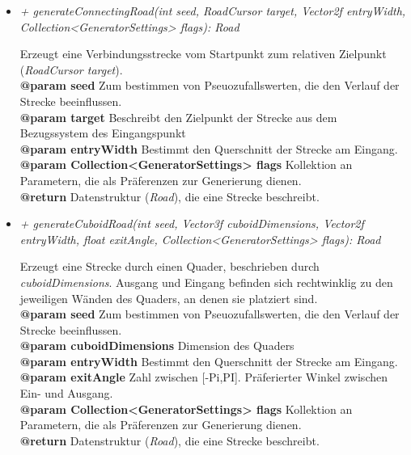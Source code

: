 \begin{itemize}
                \item  \textit{+ generateConnectingRoad(int seed, RoadCursor target,
                Vector2f entryWidth, Collection<GeneratorSettings> flags): Road}
                    \begin{leftbar}[0.9\linewidth]
                        Erzeugt eine Verbindungsstrecke vom Startpunkt zum relativen Zielpunkt (\textit{RoadCursor target}).\\
                        \textbf{@param seed} Zum bestimmen von Pseuozufallswerten, die den Verlauf der Strecke beeinflussen.\\
                        \textbf{@param target} Beschreibt den Zielpunkt der Strecke aus dem Bezugssystem des Eingangspunkt\\
                        \textbf{@param entryWidth} Bestimmt den Querschnitt der Strecke am Eingang.\\
                        \textbf{@param Collection<GeneratorSettings> flags} Kollektion an Parametern, die als Präferenzen zur Generierung dienen.\\
                        \textbf{@return} Datenstruktur (\textit{Road}), die eine Strecke beschreibt.
                    \end{leftbar}

                \pagebreak

                \item  \textit{+ generateCuboidRoad(int seed, Vector3f cuboidDimensions,
                Vector2f entryWidth, float exitAngle, Collection<GeneratorSettings> flags): Road}
                    \begin{leftbar}[0.9\linewidth]
                        Erzeugt eine Strecke durch einen Quader, beschrieben durch \textit{cuboidDimensions}.
                        Ausgang und Eingang befinden sich rechtwinklig zu den jeweiligen Wänden des Quaders, an denen sie platziert sind.\\
                        \textbf{@param seed} Zum bestimmen von Pseuozufallswerten, die den Verlauf der Strecke beeinflussen.\\
                        \textbf{@param cuboidDimensions} Dimension des Quaders\\
                        \textbf{@param entryWidth} Bestimmt den Querschnitt der Strecke am Eingang.\\
                        \textbf{@param exitAngle} Zahl zwischen [-Pi,PI]. Präferierter Winkel zwischen Ein- und Ausgang.\\
                        \textbf{@param Collection<GeneratorSettings> flags} Kollektion an Parametern, die als Präferenzen zur Generierung dienen.\\
                        \textbf{@return} Datenstruktur (\textit{Road}), die eine Strecke beschreibt.
                    \end{leftbar}
            \end{itemize}


